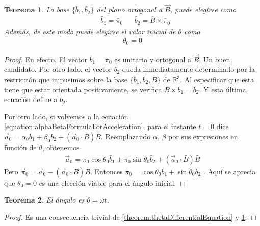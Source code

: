 \documentclass{article}
\newcommand{\realNumbers}{\mathbb{R}}
\newtheorem{theorem}{Teorema}
\begin{document}
  \begin{theorem}
    \label{theorem:constantsThatDefineTheSolution_b1b2theta0}
    La base \(\{\bar{b}_1, \bar{b}_2\}\) del plano ortogonal a \(\vec{B}\), puede elegirse como
    \begin{align}
      \label{equation:basisVectorsb1b2}
      &\bar{b}_1
      =
      \bar{\pi}_0
      &
      &\bar{b}_2
      =
      \bar{B}
      \times
      \bar{\pi}_0
    \end{align}
    Además, de este modo puede elegirse el valor inicial de \(\theta\) como 
    \begin{align}
      \theta_0 = 0
    \end{align}
  \end{theorem}
  \begin{proof}
    En efecto.
    El vector \(\bar{b}_1 = \bar{\pi}_0\) es unitario y ortogonal a \(\vec{B}\).
    Un buen candidato.
    Por otro lado, el vector \(\bar{b}_2\) queda inmediatamente determinado por la restricción que impusimos sobre la base \(\{\bar{b}_1, \bar{b}_2, \bar{B}\}\) de \(\realNumbers^3\).
    Al especificar que esta tiene que estar orientada positivamente, se verifica \(\bar{B} \times \bar{b}_1 = \bar{b}_2\).
    Y esta última ecuación define a \(\bar{b}_2\).

    Por otro lado, si volvemos a la ecuación \eqref{equation:alphaBetaFormulaForAcceleration}, para el instante \(t = 0\) dice
    \(\vec{a}_0 = \alpha_0 \bar{b}_1 + \beta_0 \bar{b}_2 + (\vec{a}_0 \cdot \bar{B}) \bar{B}\).
    Reemplazando \(\alpha\), \(\beta\) por sus expresiones en función de \(\theta\), obtenemos
    \begin{align}
      \vec{a}_0
      =
      \pi_0 \cos \theta_0 \bar{b}_1
      + \pi_0 \sin \theta_0 \bar{b}_2
      + (\vec{a}_0 \cdot \bar{B}) \bar{B}
    \end{align}
    Pero \(\vec{\pi}_0 = \vec{a}_0 - (\vec{a}_0 \cdot \bar{B}) \bar{B}\).
    Entonces
    \(
      \bar{\pi}_0
      =
      \cos \theta_0 \bar{b}_1
      + \sin \theta_0 \bar{b}_2
    \)
    .
    Aquí se aprecia que \(\theta_0 = 0\) es una elección viable para el ángulo inicial.
  \end{proof}

  \begin{theorem}
    \label{theorem:thetaSolution}
    El ángulo es \(\theta = \omega t\).
  \end{theorem}
  \begin{proof}
    Es una consecuencia trivial de \ref{theorem:thetaDifferentialEquation} y \ref{theorem:constantsThatDefineTheSolution_b1b2theta0}.
  \end{proof}
\end{document}
